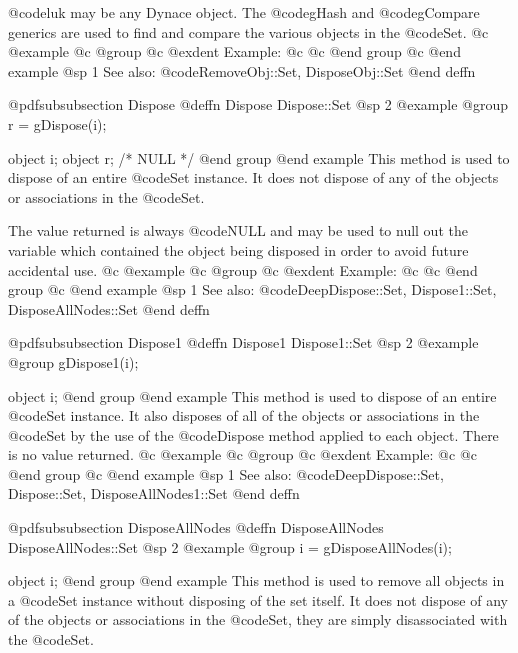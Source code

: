 @code{luk} may be any Dynace object.  The @code{gHash} and
@code{gCompare} generics are used to find and compare the various
objects in the @code{Set}.
@c @example
@c @group
@c @exdent Example:
@c 
@c @end group
@c @end example
@sp 1
See also:  @code{RemoveObj::Set, DisposeObj::Set}
@end deffn











@pdfsubsubsection {Dispose}
@deffn {Dispose} Dispose::Set
@sp 2
@example
@group
r = gDispose(i);

object  i;
object  r;     /*  NULL  */
@end group
@end example
This method is used to dispose of an entire @code{Set} instance.
It does not dispose of any of the objects or associations in the @code{Set}.

The value returned is always @code{NULL} and may be used to null out
the variable which contained the object being disposed in order to
avoid future accidental use.
@c @example
@c @group
@c @exdent Example:
@c 
@c @end group
@c @end example
@sp 1
See also:  @code{DeepDispose::Set, Dispose1::Set, DisposeAllNodes::Set}
@end deffn










@pdfsubsubsection {Dispose1}
@deffn {Dispose1} Dispose1::Set
@sp 2
@example
@group
gDispose1(i);

object  i;
@end group
@end example
This method is used to dispose of an entire @code{Set} instance.  It also
disposes of all of the objects or associations in the @code{Set} by the use of
the @code{Dispose} method applied to each object.  There is no value
returned.
@c @example
@c @group
@c @exdent Example:
@c 
@c @end group
@c @end example
@sp 1
See also:  @code{DeepDispose::Set, Dispose::Set, DisposeAllNodes1::Set}
@end deffn















@pdfsubsubsection {DisposeAllNodes}
@deffn {DisposeAllNodes} DisposeAllNodes::Set
@sp 2
@example
@group
i = gDisposeAllNodes(i);

object  i;
@end group
@end example
This method is used to remove all objects in a @code{Set} instance
without disposing of the set itself.  It does not dispose of any of the
objects or associations in the @code{Set}, they are simply
disassociated with the @code{Set}.

